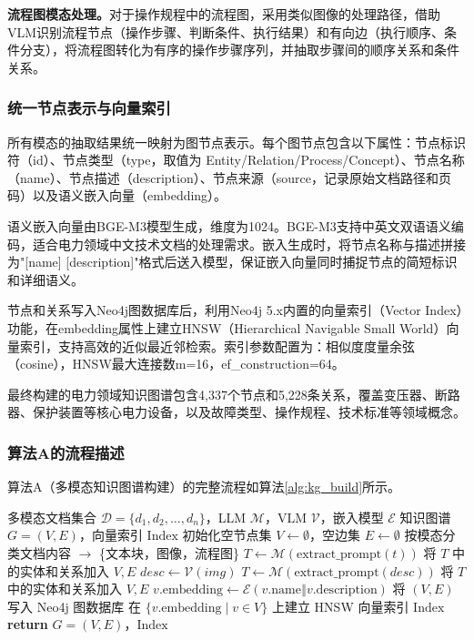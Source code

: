 \textbf{流程图模态处理。}对于操作规程中的流程图，采用类似图像的处理路径，借助VLM识别流程节点（操作步骤、判断条件、执行结果）和有向边（执行顺序、条件分支），将流程图转化为有序的操作步骤序列，并抽取步骤间的顺序关系和条件关系。

\subsubsection{统一节点表示与向量索引}

所有模态的抽取结果统一映射为图节点表示。每个图节点包含以下属性：节点标识符（id）、节点类型（type，取值为 Entity/Relation/Process/Concept）、节点名称（name）、节点描述（description）、节点来源（source，记录原始文档路径和页码）以及语义嵌入向量（embedding）。

语义嵌入向量由BGE-M3模型\cite{chen2024bgem3}生成，维度为1024。BGE-M3支持中英文双语语义编码，适合电力领域中文技术文档的处理需求。嵌入生成时，将节点名称与描述拼接为"[name] [description]"格式后送入模型，保证嵌入向量同时捕捉节点的简短标识和详细语义。

节点和关系写入Neo4j图数据库后，利用Neo4j 5.x内置的向量索引（Vector Index）功能，在embedding属性上建立HNSW（Hierarchical Navigable Small World）向量索引，支持高效的近似最近邻检索。索引参数配置为：相似度度量余弦（cosine），HNSW最大连接数m=16，ef\_construction=64。

最终构建的电力领域知识图谱包含4,337个节点和5,228条关系，覆盖变压器、断路器、保护装置等核心电力设备，以及故障类型、操作规程、技术标准等领域概念。

\subsubsection{算法A的流程描述}

算法A（多模态知识图谱构建）的完整流程如算法\ref{alg:kg_build}所示。

\begin{algorithm}[H]
\caption{多模态知识图谱构建算法（算法A）}
\label{alg:kg_build}
\begin{algorithmic}[1]
\Require 多模态文档集合 $\mathcal{D} = \{d_1, d_2, \ldots, d_n\}$，LLM $\mathcal{M}$，VLM $\mathcal{V}$，嵌入模型 $\mathcal{E}$
\Ensure 知识图谱 $G = (V, E)$，向量索引 $\mathrm{Index}$
\State 初始化空节点集 $V \gets \emptyset$，空边集 $E \gets \emptyset$
    \State 按模态分类文档内容 $\to$ \{文本块，图像，流程图\}
        \State $T \gets \mathcal{M}(\mathrm{extract\_prompt}(t))$
        \State 将 $T$ 中的实体和关系加入 $V, E$
    \EndFor
        \State $desc \gets \mathcal{V}(img)$
        \State $T \gets \mathcal{M}(\mathrm{extract\_prompt}(desc))$
        \State 将 $T$ 中的实体和关系加入 $V, E$
    \EndFor
\EndFor
{}
    \State $v.\mathrm{embedding} \gets \mathcal{E}(v.\mathrm{name} \mathbin\Vert v.\mathrm{description})$
\EndFor
\State 将 $(V, E)$ 写入 Neo4j 图数据库
\State 在 $\{v.\mathrm{embedding} \mid v \in V\}$ 上建立 HNSW 向量索引 $\mathrm{Index}$
\State \textbf{return} $G = (V, E)$，$\mathrm{Index}$
\end{algorithmic}
\end{algorithm}

